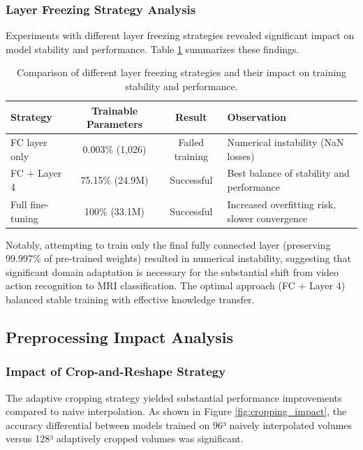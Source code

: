 \documentclass[12pt, a4paper]{article}
\begin{document}

\subsubsection{Layer Freezing Strategy Analysis}

Experiments with different layer freezing strategies revealed significant impact on model stability and performance. Table \ref{tab:freezing_strategies} summarizes these findings.

\begin{table}[htbp]
\centering
\begin{tabular}{|l|c|c|p{4cm}|}
\hline
\textbf{Strategy} & \textbf{Trainable Parameters} & \textbf{Result} & \textbf{Observation} \\
\hline
FC layer only & 0.003\% (1,026) & Failed training & Numerical instability (NaN losses) \\
\hline
FC + Layer 4 & 75.15\% (24.9M) & Successful & Best balance of stability and performance \\
\hline
Full fine-tuning & 100\% (33.1M) & Successful & Increased overfitting risk, slower convergence \\
\hline
\end{tabular}
\caption{Comparison of different layer freezing strategies and their impact on training stability and performance.}
\label{tab:freezing_strategies}
\end{table}

Notably, attempting to train only the final fully connected layer (preserving 99.997\% of pre-trained weights) resulted in numerical instability, suggesting that significant domain adaptation is necessary for the substantial shift from video action recognition to MRI classification. The optimal approach (FC + Layer 4) balanced stable training with effective knowledge transfer.

\subsection{Preprocessing Impact Analysis}

\subsubsection{Impact of Crop-and-Reshape Strategy}

The adaptive cropping strategy yielded substantial performance improvements compared to naive interpolation. As shown in Figure \ref{fig:cropping_impact}, the accuracy differential between models trained on 96³ naively interpolated volumes versus 128³ adaptively cropped volumes was significant.
\end{document}
